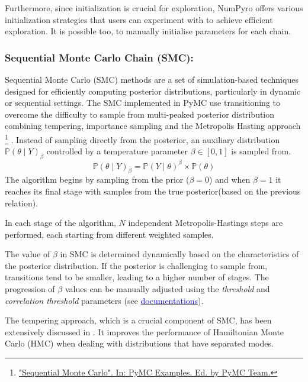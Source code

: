 \documentclass[nonatbib,preprint,12pt,authoryear]{elsarticle}
\begin{document}
Furthermore, since initialization is crucial for exploration, NumPyro offers various initialization strategies that users can experiment with to achieve efficient exploration. It is possible too, to manually initialise parameters for each chain.

\subsubsection{Sequential Monte Carlo Chain (SMC):} Sequential Monte Carlo (SMC) methods are a set of simulation-based techniques designed for efficiently computing posterior distributions, particularly in dynamic or sequential settings\cite{Doucet2001_SMC_Intro,KANTAS2009774_SMC_Overview}.
The SMC implemented in PyMC use transitioning to overcome the difficulty to sample from multi-peaked posterior distribution combining tempering, importance sampling and the Metropolis Hasting approach \footnote{\href{https://www.pymc.io/projects/examples/en/latest/samplers/SMC2_gaussians.html}{"Sequential Monte Carlo". In: PyMC Examples. Ed. by PyMC Team.}} \cite{minson_bayesian_2013_TMCMC,Transitional_MCMC}. Instead of sampling directly from the posterior, an auxiliary distribution $\mathbb{P}(\theta \mid Y)_\beta $ controlled by a temperature parameter $\beta \in [0,1]$ is sampled from. 
$$\mathbb{P}(\theta \mid Y)_\beta = \mathbb{P}(Y \mid \theta)^\beta \times \mathbb{P}(\theta) $$
The algorithm begins by sampling from the prior ($\beta = 0$) and when $\beta = 1$ it reaches its final stage with samples from the true posterior(based on the previous relation).

In each stage of the algorithm, $N$ independent Metropolis-Hastings steps are performed, each starting from different weighted samples. 

The value of $\beta$ in SMC is determined dynamically based on the characteristics of the posterior distribution. If the posterior is challenging to sample from, transitions tend to be smaller, leading to a higher number of stages. The progression of $\beta$ values can be manually adjusted using the \textit{threshold} and \textit{correlation threshold} parameters (see \href{https://www.pymc.io/projects/docs/en/latest/api/generated/pymc.smc.sample_smc.html}{\textcolor{blue}{documentations}}).

The tempering approach, which is a crucial component of SMC, has been extensively discussed in \cite{Brooks_NEAL_HMC_2011}. It improves the performance of Hamiltonian Monte Carlo (HMC) when dealing with distributions that have separated modes.
\end{document}
